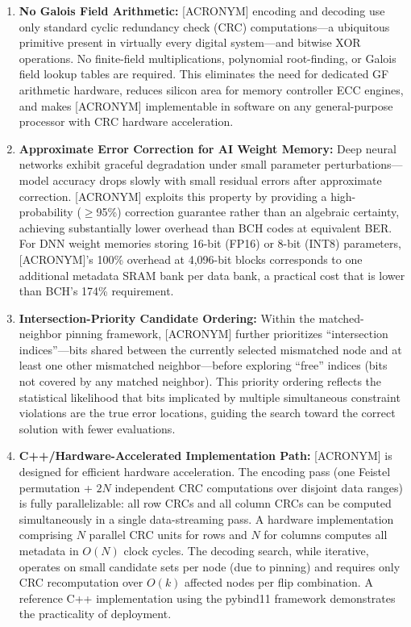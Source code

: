 \begin{enumerate}
    \item \textbf{No Galois Field Arithmetic:} [ACRONYM] encoding and decoding use only standard cyclic redundancy check (CRC) computations---a ubiquitous primitive present in virtually every digital system---and bitwise XOR operations. No finite-field multiplications, polynomial root-finding, or Galois field lookup tables are required. This eliminates the need for dedicated GF arithmetic hardware, reduces silicon area for memory controller ECC engines, and makes [ACRONYM] implementable in software on any general-purpose processor with CRC hardware acceleration.

    \item \textbf{Approximate Error Correction for AI Weight Memory:} Deep neural networks exhibit graceful degradation under small parameter perturbations---model accuracy drops slowly with small residual errors after approximate correction. [ACRONYM] exploits this property by providing a high-probability ($\geq$95\%) correction guarantee rather than an algebraic certainty, achieving substantially lower overhead than BCH codes at equivalent BER. For DNN weight memories storing 16-bit (FP16) or 8-bit (INT8) parameters, [ACRONYM]'s 100\% overhead at 4,096-bit blocks corresponds to one additional metadata SRAM bank per data bank, a practical cost that is lower than BCH's 174\% requirement.

    \item \textbf{Intersection-Priority Candidate Ordering:} Within the matched-neighbor pinning framework, [ACRONYM] further prioritizes ``intersection indices''---bits shared between the currently selected mismatched node and at least one other mismatched neighbor---before exploring ``free'' indices (bits not covered by any matched neighbor). This priority ordering reflects the statistical likelihood that bits implicated by multiple simultaneous constraint violations are the true error locations, guiding the search toward the correct solution with fewer evaluations.

    \item \textbf{C++/Hardware-Accelerated Implementation Path:} [ACRONYM] is designed for efficient hardware acceleration. The encoding pass (one Feistel permutation + $2N$ independent CRC computations over disjoint data ranges) is fully parallelizable: all row CRCs and all column CRCs can be computed simultaneously in a single data-streaming pass. A hardware implementation comprising $N$ parallel CRC units for rows and $N$ for columns computes all metadata in $O(N)$ clock cycles. The decoding search, while iterative, operates on small candidate sets per node (due to pinning) and requires only CRC recomputation over $O(k)$ affected nodes per flip combination. A reference C++ implementation using the pybind11 framework demonstrates the practicality of deployment.

\end{enumerate}

